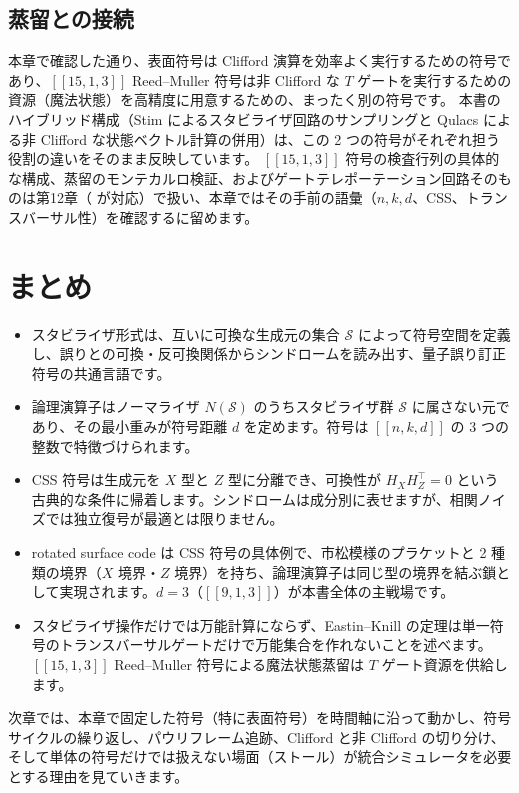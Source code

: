 \subsection{蒸留との接続}

本章で確認した通り、表面符号は Clifford 演算を効率よく実行するための符号であり、$[[15,1,3]]$ Reed–Muller 符号は非 Clifford な $T$ ゲートを実行するための資源（魔法状態）を高精度に用意するための、まったく別の符号です。
本書のハイブリッド構成（Stim によるスタビライザ回路のサンプリングと Qulacs による非 Clifford な状態ベクトル計算の併用）は、この 2 つの符号がそれぞれ担う役割の違いをそのまま反映しています。
$[[15,1,3]]$ 符号の検査行列の具体的な構成、蒸留のモンテカルロ検証、およびゲートテレポーテーション回路そのものは第12章（ が対応）で扱い、本章ではその手前の語彙（$n,k,d$、CSS、トランスバーサル性）を確認するに留めます。

\section{まとめ}\label{ch4:summary}

\begin{itemize}
  \item スタビライザ形式は、互いに可換な生成元の集合 $\mathcal{S}$ によって符号空間を定義し、誤りとの可換・反可換関係からシンドロームを読み出す、量子誤り訂正符号の共通言語です。
  \item 論理演算子はノーマライザ $N(\mathcal{S})$ のうちスタビライザ群 $\mathcal{S}$ に属さない元であり、その最小重みが符号距離 $d$ を定めます。符号は $[[n,k,d]]$ の 3 つの整数で特徴づけられます。
  \item CSS 符号は生成元を $X$ 型と $Z$ 型に分離でき、可換性が $H_XH_Z^{\top}=0$ という古典的な条件に帰着します。シンドロームは成分別に表せますが、相関ノイズでは独立復号が最適とは限りません。
  \item rotated surface code は CSS 符号の具体例で、市松模様のプラケットと 2 種類の境界（$X$ 境界・$Z$ 境界）を持ち、論理演算子は同じ型の境界を結ぶ鎖として実現されます。$d=3$（$[[9,1,3]]$）が本書全体の主戦場です。
  \item スタビライザ操作だけでは万能計算にならず、Eastin--Knill の定理は単一符号のトランスバーサルゲートだけで万能集合を作れないことを述べます。$[[15,1,3]]$ Reed--Muller 符号による魔法状態蒸留は $T$ ゲート資源を供給します。
\end{itemize}

次章では、本章で固定した符号（特に表面符号）を時間軸に沿って動かし、符号サイクルの繰り返し、パウリフレーム追跡、Clifford と非 Clifford の切り分け、そして単体の符号だけでは扱えない場面（ストール）が統合シミュレータを必要とする理由を見ていきます。

